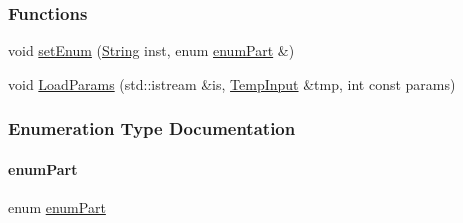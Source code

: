 \subsubsection*{Functions}
\begin{DoxyCompactItemize}
\item 
void \mbox{\hyperlink{_inventory_8h_aa9bc06c48979e6ec21d5fe16ca9b8164}{set\+Enum}} (\mbox{\hyperlink{class_string}{String}} inst, enum \mbox{\hyperlink{_inventory_8h_abddff37837f171d72a2e16a1448a3943}{enum\+Part}} \&)
\item 
void \mbox{\hyperlink{_inventory_8h_a027b287b99619c750f30b4765ec929e5}{Load\+Params}} (std\+::istream \&is, \mbox{\hyperlink{struct_temp_input}{Temp\+Input}} \&tmp, int const params)
\end{DoxyCompactItemize}


\subsubsection{Enumeration Type Documentation}
\mbox{\label{_inventory_8h_abddff37837f171d72a2e16a1448a3943}} 
\paragraph{\texorpdfstring{enumPart}{enumPart}}
{\footnotesize\ttfamily enum \mbox{\hyperlink{_inventory_8h_abddff37837f171d72a2e16a1448a3943}{enum\+Part}}}

